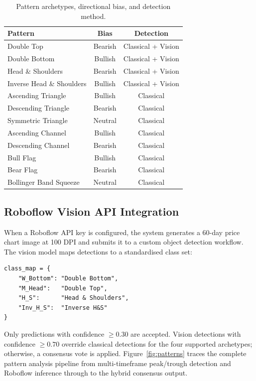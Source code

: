\documentclass[10pt,a4paper,twoside]{article}
\begin{document}
\begin{table}[htb]
  \begin{center}
    {\caption{Pattern archetypes, directional bias, and detection method.}
    \label{tab:patterns}}
    \begin{tabular}{|l|c|c|}
    \hline
    \textbf{Pattern} & \textbf{Bias} & \textbf{Detection} \\
    \hline
    Double Top & Bearish & Classical + Vision \\
    Double Bottom & Bullish & Classical + Vision \\
    Head \& Shoulders & Bearish & Classical + Vision \\
    Inverse Head \& Shoulders & Bullish & Classical + Vision \\
    Ascending Triangle & Bullish & Classical \\
    Descending Triangle & Bearish & Classical \\
    Symmetric Triangle & Neutral & Classical \\
    Ascending Channel & Bullish & Classical \\
    Descending Channel & Bearish & Classical \\
    Bull Flag & Bullish & Classical \\
    Bear Flag & Bearish & Classical \\
    Bollinger Band Squeeze & Neutral & Classical \\
    \hline
    \end{tabular}
  \end{center}
\end{table}

\subsection{Roboflow Vision API Integration}

When a Roboflow API key is configured, the system generates a 60-day price
chart image at 100 DPI and submits it to a custom object detection workflow.
The vision model maps detections to a standardised class set:
\begin{verbatim}
class_map = {
    "W_Bottom": "Double Bottom",
    "M_Head":   "Double Top",
    "H_S":      "Head & Shoulders",
    "Inv_H_S":  "Inverse H&S"
}
\end{verbatim}
Only predictions with confidence $\geq 0.30$ are accepted. Vision detections
with confidence $\geq 0.70$ override classical detections for the four supported
archetypes; otherwise, a consensus vote is applied. Figure~\ref{fig:patterns}
traces the complete pattern analysis pipeline from multi-timeframe peak/trough
detection and Roboflow inference through to the hybrid consensus output.
\end{document}

